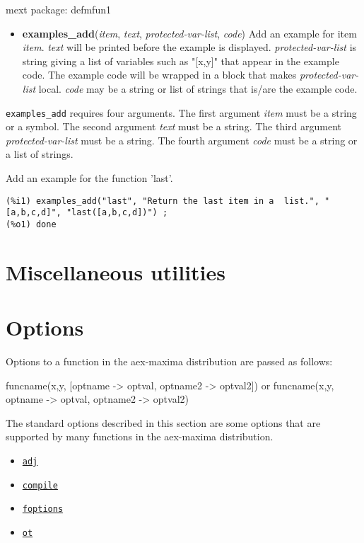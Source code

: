 \documentclass[]{article}
\begin{document}
\noindent mext package: defmfun1



\vspace{5 pt}
\begin{itemize}
\item[] {\bf examples\_add}({\it item}, {\it text}, {\it protected-var-list}, {\it code})
  Add an example for item {\it item}. {\it text} will be printed before the example is displayed. {\it protected-var-list} is string giving a list of variables such as "[x,y]" that appear in the example code. The example code will be wrapped in a block that makes {\it protected-var-list} local. {\it 
code} may be a string or list of strings that is/are the example code. 

\end{itemize}
   {\tt examples\_add} requires four arguments.
    The first argument {\it item} must be a string or a symbol.
    The second argument {\it text} must be a string.
    The third argument {\it protected-var-list} must be a string.
    The fourth argument {\it code} must be a string or a list of strings.


\vspace{5 pt}


   Add an example for the function 'last'. 

\begin{Verbatim}[frame=single]
(%i1) examples_add("last", "Return the last item in a  list.", "[a,b,c,d]", "last([a,b,c,d])") ;
(%o1) done
\end{Verbatim}


\section{Miscellaneous utilities}
\section{Options}

 Options to a function in the aex-maxima distribution are passed as follows:

    funcname(x,y, [optname -> optval, optname2 -> optval2])
    or
    funcname(x,y, optname -> optval, optname2 -> optval2)

 The standard options described in this section are some options that are supported by
 many functions in the aex-maxima distribution.
\begin{itemize}
\item \hyperlink{adj}{{\tt adj}}
\item \hyperlink{compile}{{\tt compile}}
\item \hyperlink{foptions}{{\tt foptions}}
\item \hyperlink{ot}{{\tt ot}}
\end{itemize}
\end{document}
